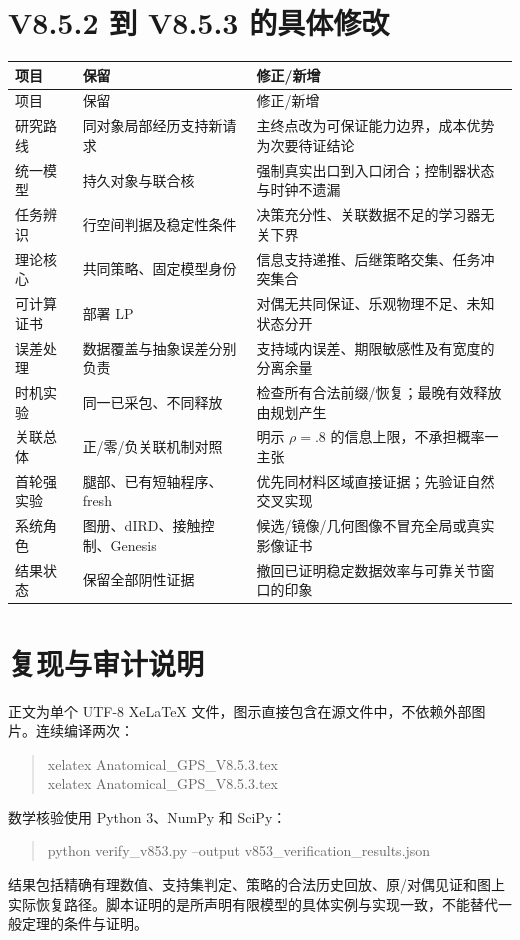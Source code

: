 \documentclass[11pt,a4paper,fontset=fandol]{ctexart}
\theoremstyle{definition}
\theoremstyle{remark}\newtheorem{remark}[theorem]{说明}
\numberwithin{equation}{section}
\begin{document}
\section{V8.5.2 到 V8.5.3 的具体修改}
\begin{longtable}{P{.24\linewidth}P{.33\linewidth}P{.33\linewidth}}
\toprule
项目 & 保留 & 修正/新增\\\midrule
\endfirsthead
\toprule 项目 & 保留 & 修正/新增\\\midrule
\endhead
研究路线 & 同对象局部经历支持新请求 & 主终点改为可保证能力边界，成本优势为次要待证结论\\
统一模型 & 持久对象与联合核 & 强制真实出口到入口闭合；控制器状态与时钟不遗漏\\
任务辨识 & 行空间判据及稳定性条件 & 决策充分性、关联数据不足的学习器无关下界\\
理论核心 & 共同策略、固定模型身份 & 信息支持递推、后继策略交集、任务冲突集合\\
可计算证书 & 部署 LP & 对偶无共同保证、乐观物理不足、未知状态分开\\
误差处理 & 数据覆盖与抽象误差分别负责 & 支持域内误差、期限敏感性及有宽度的分离余量\\
时机实验 & 同一已采包、不同释放 & 检查所有合法前缀/恢复；最晚有效释放由规划产生\\
关联总体 & 正/零/负关联机制对照 & 明示 $\rho=.8$ 的信息上限，不承担概率一主张\\
首轮强实验 & 腿部、已有短轴程序、fresh & 优先同材料区域直接证据；先验证自然交叉实现\\
系统角色 & 图册、dIRD、接触控制、Genesis & 候选/镜像/几何图像不冒充全局或真实影像证书\\
结果状态 & 保留全部阴性证据 & 撤回已证明稳定数据效率与可靠关节窗口的印象\\
\bottomrule
\end{longtable}

\section{复现与审计说明}
正文为单个 UTF-8 XeLaTeX 文件，图示直接包含在源文件中，不依赖外部图片。连续编译两次：
\begin{quote}\small\ttfamily
xelatex Anatomical\_GPS\_V8.5.3.tex\\
xelatex Anatomical\_GPS\_V8.5.3.tex
\end{quote}
数学核验使用 Python 3、NumPy 和 SciPy：
\begin{quote}\small\ttfamily
python verify\_v853.py --output v853\_verification\_results.json
\end{quote}
结果包括精确有理数值、支持集判定、策略的合法历史回放、原/对偶见证和图上实际恢复路径。脚本证明的是所声明有限模型的具体实例与实现一致，不能替代一般定理的条件与证明。
\end{document}
